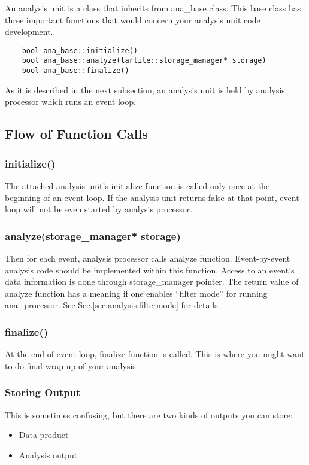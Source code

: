 
An analysis unit is a \CPP class that inherits from {\ttfamily ana\_base} class. 
This base class has three important functions that would concern your analysis unit code development.
\begin{lstlisting}
    bool ana_base::initialize()
    bool ana_base::analyze(larlite::storage_manager* storage)
    bool ana_base::finalize()
\end{lstlisting}
As it is described in the next subsection, an analysis unit is held by analysis processor which runs an event loop.

\subsection{Flow of Function Calls}

\subsubsection{{\ttfamily initialize()}}
The attached analysis unit's {\ttfamily initialize} function is called only once at the beginning of an event loop. 
If the analysis unit returns {\ttfamily false} at that point, event loop will not be even started by analysis processor.

\subsubsection{{\ttfamily analyze(storage\_manager* storage)}}
Then for each event, analysis processor calls {\ttfamily analyze} function. Event-by-event analysis code should be implemented within this function. Access to an event's data information is done through {\ttfamily storage\_manager} pointer. The return value of {\ttfamily analyze} function has a meaning if one enables ``filter mode'' for running {\ttfamily ana\_processor}. See Sec.\ref{sec:analysis:filtermode} for details.

\subsubsection{{\ttfamily finalize()}}
At the end of event loop, {\ttfamily finalize} function is called. This is where you might want to do final wrap-up of your analysis.

\subsubsection{Storing Output}
This is sometimes confusing, but there are two kinds of outputs you can store:
\begin{itemize}
\item Data product
\item Analysis output
\end{itemize}

